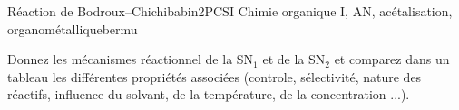
\begin{exercise}{Réaction de Bodroux–Chichibabin}{2}{PCSI}
{Chimie organique I, AN, acétalisation, organométallique}{bermu}


\begin{questions}
\questioncours Donnez les mécanismes réactionnel de la $\mathrm{SN_1}$ et de la $\mathrm{SN_2}$ et comparez dans un tableau les différentes propriétés associées (controle, sélectivité, nature des réactifs, influence du solvant, de la température, de la concentration ...).


\end{questions}
\end{exercise}